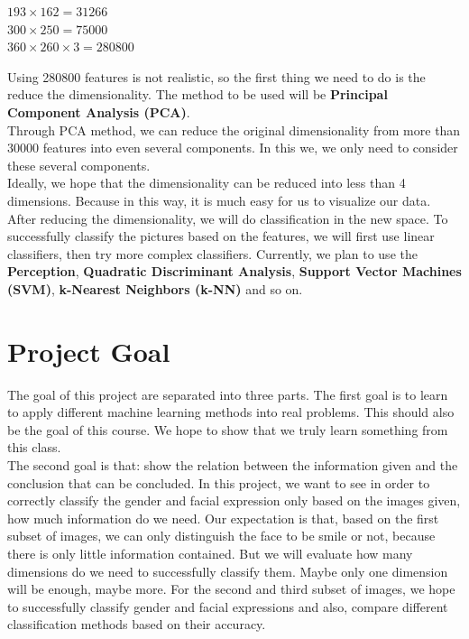 \documentclass[11pt]{article}
\begin{document}
\begin{center}
$193 \times 162 = 31266$\\
$300 \times 250 = 75000$\\
$360 \times 260 \times 3 = 280800$\\
\end{center}
Using 280800 features is not realistic, so the first thing we need to do is the reduce the dimensionality. The method to be used will be {\bf Principal Component Analysis (PCA)}.\\

Through PCA method, we can reduce the original dimensionality from more than 30000 features into even several components. In this we, we only need to consider these several components.\\

Ideally, we hope that the dimensionality can be reduced into less than 4 dimensions. Because in this way, it is much easy for us to visualize our data.\\

After reducing the dimensionality, we will do classification in the new space. To successfully classify the pictures based on the features, we will first use linear classifiers, then try more complex classifiers. Currently, we plan to use the {\bf Perception}, {\bf Quadratic Discriminant Analysis}, {\bf Support Vector Machines (SVM)}, {\bf k-Nearest Neighbors (k-NN)} and so on.\\

\section{Project Goal}

The goal of this project are separated into three parts. The first goal is to learn to apply different machine learning methods into real problems. This should also be the goal of this course. We hope to show that we truly learn something from this class.\\

The second goal is that: show the relation between the information given and the conclusion that can be concluded. In this project, we want to see in order to correctly classify the gender and facial expression only based on the images given, how much information do we need. Our expectation is that, based on the first subset of images, we can only distinguish the face to be smile or not, because there is only little information contained. But we will evaluate how many dimensions do we need to successfully classify them. Maybe only one dimension will be enough, maybe more. For the second and third subset of images, we hope to successfully classify gender and facial expressions and also, compare different classification methods based on their accuracy. \\
\end{document}
